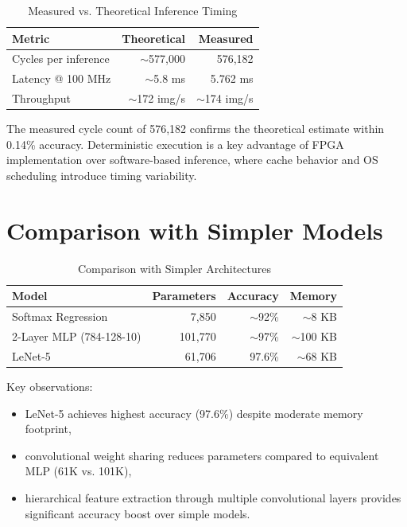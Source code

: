 \documentclass[12pt,a4paper]{report}
\begin{document}
\begin{table}[H]
\centering
\caption{Measured vs. Theoretical Inference Timing}
\begin{tabular}{lrr}
\toprule
\textbf{Metric} & \textbf{Theoretical} & \textbf{Measured} \\
\midrule
Cycles per inference & $\sim$577,000 & 576,182 \\
Latency @ 100 MHz & $\sim$5.8 ms & 5.762 ms \\
Throughput & $\sim$172 img/s & $\sim$174 img/s \\
\bottomrule
\end{tabular}
\end{table}

The measured cycle count of 576,182 confirms the theoretical estimate within 0.14\% accuracy. Deterministic execution is a key advantage of FPGA implementation over software-based inference, where cache behavior and OS scheduling introduce timing variability.

\section{Comparison with Simpler Models}

\begin{table}[H]
\centering
\caption{Comparison with Simpler Architectures}
\begin{tabular}{lrrr}
\toprule
\textbf{Model} & \textbf{Parameters} & \textbf{Accuracy} & \textbf{Memory} \\
\midrule
Softmax Regression & 7,850 & $\sim$92\% & $\sim$8 KB \\
2-Layer MLP (784-128-10) & 101,770 & $\sim$97\% & $\sim$100 KB \\
LeNet-5 & 61,706 & 97.6\% & $\sim$68 KB \\
\bottomrule
\end{tabular}
\end{table}

Key observations:
\begin{itemize}
    \item LeNet-5 achieves highest accuracy (97.6\%) despite moderate memory footprint,
    \item convolutional weight sharing reduces parameters compared to equivalent MLP (61K vs. 101K),
    \item hierarchical feature extraction through multiple convolutional layers provides significant accuracy boost over simple models.
\end{itemize}
\end{document}
